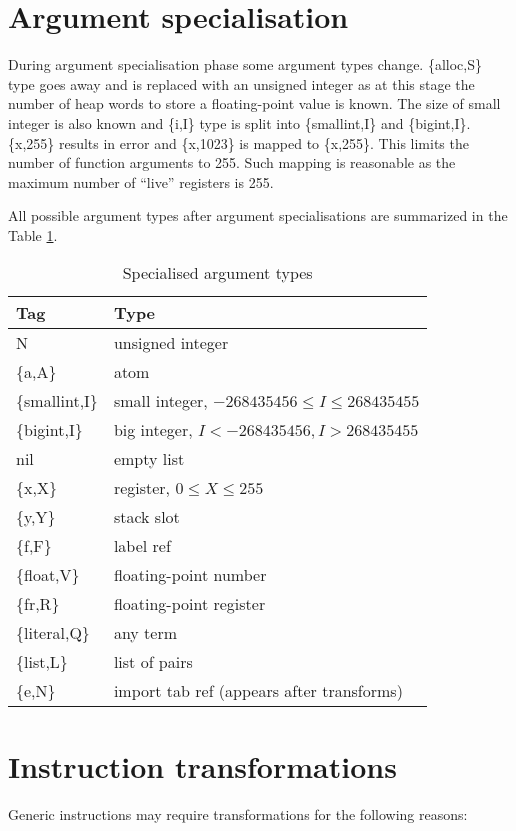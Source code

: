 \documentclass{article}
\begin{document}
\section*{Argument specialisation}

During argument specialisation phase some argument types change. \{alloc,S\}
type goes away and is replaced with an unsigned integer as at this stage the
number of heap words to store a floating-point value is known. The size of small
integer is also known and \{i,I\} type is split into \{smallint,I\} and
\{bigint,I\}. \{x,255\} results in error and \{x,1023\} is mapped to \{x,255\}.
This limits the number of function arguments to 255. Such mapping is reasonable
as the maximum number of ``live'' registers is 255.

 All possible argument types after argument specialisations
are summarized in the Table \ref{tab:spectypes}.

\begin{table}[!ht]
\begin{tabular}{ll}
Tag & Type \\
\hline
N & unsigned integer \\
\{a,A\} & atom \\
\{smallint,I\} & small integer, $-268435456 \leqslant I \leqslant 268435455$ \\
\{bigint,I\} & big integer, $I < -268435456, I > 268435455$ \\
nil & empty list \\
\{x,X\} & register, $0 \leqslant X \leqslant 255$ \\
\{y,Y\} & stack slot \\
\{f,F\} & label ref \\
\{float,V\} & floating-point number \\
\{fr,R\} & floating-point register \\
\{literal,Q\} & any term \\
\{list,L\} & list of pairs \\
\{e,N\} & import tab ref (appears after transforms) \\
\hline
\end{tabular}
\caption{Specialised argument types\label{tab:spectypes}}
\end{table}

\section*{Instruction transformations}

Generic instructions may require transformations for the following reasons$:$
\end{document}
